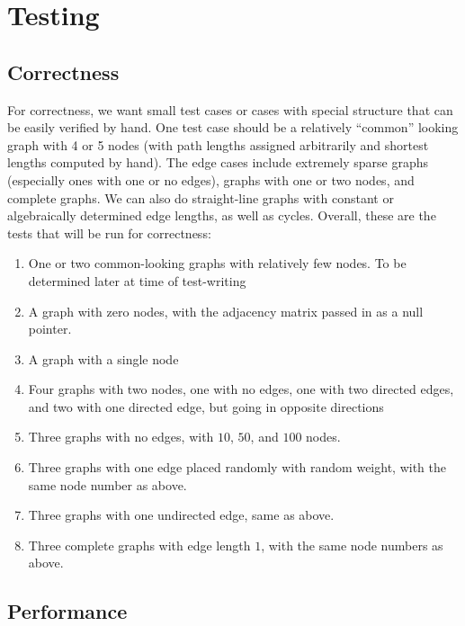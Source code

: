 \documentclass{article}
\begin{document}
\section*{Testing}
\subsection*{Correctness}
For correctness, we want small test cases or cases with special structure that can be easily verified by hand. One test case should be a relatively ``common'' looking graph with 4 or 5 nodes (with path lengths assigned arbitrarily and shortest lengths computed by hand). The edge cases include extremely sparse graphs (especially ones with one or no edges), graphs with one or two nodes, and complete graphs. We can also do straight-line graphs with constant or algebraically determined edge lengths, as well as cycles. Overall, these are the tests that will be run for correctness:
\begin{enumerate}
    \item One or two common-looking graphs with relatively few nodes. To be determined later at time of test-writing
    \item A graph with zero nodes, with the adjacency matrix passed in as a null pointer.
    \item A graph with a single node
    \item Four graphs with two nodes, one with no edges, one with two directed edges, and two with one directed edge, but going in opposite directions
    \item Three graphs with no edges, with $10$, $50$, and $100$ nodes.
    \item Three graphs with one edge placed randomly with random weight, with the same node number as above.
    \item Three graphs with one undirected edge, same as above.
    \item Three complete graphs with edge length $1$, with the same node numbers as above.
\end{enumerate}
\subsection*{Performance}
\end{document}
